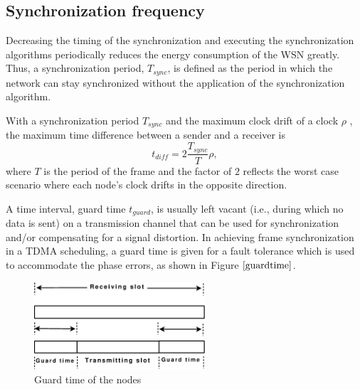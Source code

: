 \documentclass[journal]{IEEEtran}
\begin{document}
\subsection{\textbf{Synchronization frequency}}
Decreasing the timing of the synchronization and executing the synchronization algorithms periodically reduces
the energy consumption of the WSN greatly. Thus, a synchronization period, $T_{sync}$, is defined as the period in which the network can stay synchronized without the application of the synchronization algorithm.
\par With a synchronization period $T_{sync}$ and the
maximum clock drift of a clock $\rho$ , the maximum time difference
between a sender and a receiver is
\begin{equation}
t_{diff} = 2\dfrac{T_{sync}}{T}\rho ,
\end{equation}
where $T$ is the period of the frame and the factor of $2$ reflects the worst case scenario where each
node's clock drifts in the opposite direction.\par
A time interval, guard time $t_{guard}$, is usually left vacant (i.e., during which no data is sent) on a transmission channel that can be used for synchronization and/or compensating for a signal distortion. In achieving frame synchronization in a TDMA scheduling, a guard time is given for a fault tolerance which is used to accommodate the phase errors, as shown in Figure $\ref{guardtime}$.
\begin{figure}[t]
\centering
\includegraphics[width=2.5in]{guardtime}
\caption{Guard time of the nodes} \label{guardtime}
\end{figure}
\end{document}
